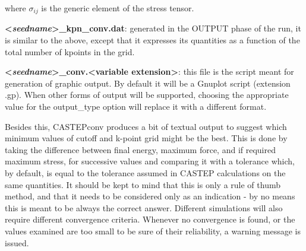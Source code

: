 \documentclass[10pt]{article}
\begin{document}
where $\sigma_{ij}$ is the generic element of the stress tensor.

\textbf{\textless \textit{seedname}\textgreater\_kpn\_conv.dat}: generated in 
the OUTPUT phase of the run, it is similar to the above, except that it 
expresses its quantities as a function of the total number of kpoints in the 
grid.

\textbf{\textless \textit{seedname}\textgreater\_conv.\textless variable 
extension\textgreater}: this file is the script meant for generation of graphic 
output. By default it will be a Gnuplot script (extension .gp). When other forms 
of output will be supported, choosing the appropriate value for the output\_type 
option will replace it with a different format.

Besides this, CASTEPconv produces a bit of textual output to suggest which 
minimum values of cutoff and k-point grid might be the best. This is done by 
taking the difference between final energy, maximum force, and if required 
maximum stress, for successive values and comparing it with a tolerance which, 
by default, is equal to the tolerance assumed in CASTEP calculations on the same 
quantities. It should be kept to mind that this is only a rule of thumb method, 
and that it needs to be considered only as an indication - by no means this is 
meant to be always the correct answer. Different simulations will also require 
different convergence criteria. Whenever no convergence is found, or the values 
examined are too small to be sure of their reliability, a warning message is 
issued.
\end{document}
